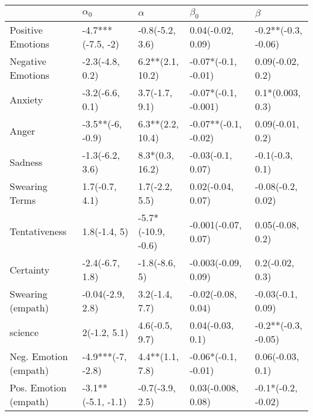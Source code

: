 \begin{tabular}{lllll}
\toprule
{} &          $\alpha_0$ &            $\alpha$ &             $\beta_0$ &              $\beta$ \\
\midrule
Positive Emotions     &   -4.7***(-7.5, -2) &     -0.8(-5.2, 3.6) &     0.04(-0.02, 0.09) &  -0.2**(-0.3, -0.06) \\
Negative Emotions     &     -2.3(-4.8, 0.2) &    6.2**(2.1, 10.2) &   -0.07*(-0.1, -0.01) &     0.09(-0.02, 0.2) \\
Anxiety               &     -3.2(-6.6, 0.1) &      3.7(-1.7, 9.1) &  -0.07*(-0.1, -0.001) &     0.1*(0.003, 0.3) \\
Anger                 &    -3.5**(-6, -0.9) &    6.3**(2.2, 10.4) &  -0.07**(-0.1, -0.02) &     0.09(-0.01, 0.2) \\
Sadness               &     -1.3(-6.2, 3.6) &     8.3*(0.3, 16.2) &     -0.03(-0.1, 0.07) &      -0.1(-0.3, 0.1) \\
Swearing Terms        &      1.7(-0.7, 4.1) &      1.7(-2.2, 5.5) &     0.02(-0.04, 0.07) &    -0.08(-0.2, 0.02) \\
Tentativeness         &        1.8(-1.4, 5) &  -5.7*(-10.9, -0.6) &   -0.001(-0.07, 0.07) &     0.05(-0.08, 0.2) \\
Certainty             &     -2.4(-6.7, 1.8) &       -1.8(-8.6, 5) &   -0.003(-0.09, 0.09) &      0.2(-0.02, 0.3) \\
Swearing (empath)     &    -0.04(-2.9, 2.8) &      3.2(-1.4, 7.7) &    -0.02(-0.08, 0.04) &    -0.03(-0.1, 0.09) \\
science               &        2(-1.2, 5.1) &      4.6(-0.5, 9.7) &      0.04(-0.03, 0.1) &  -0.2**(-0.3, -0.05) \\
Neg. Emotion (empath) &   -4.9***(-7, -2.8) &     4.4**(1.1, 7.8) &   -0.06*(-0.1, -0.01) &     0.06(-0.03, 0.1) \\
Pos. Emotion (empath) &  -3.1**(-5.1, -1.1) &     -0.7(-3.9, 2.5) &    0.03(-0.008, 0.08) &   -0.1*(-0.2, -0.02) \\
\bottomrule
\end{tabular}
